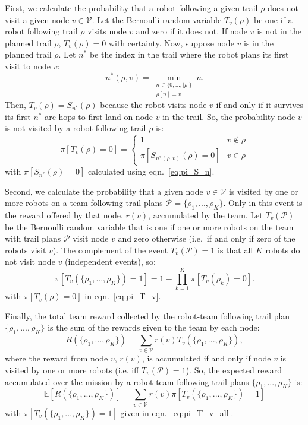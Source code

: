 \documentclass[fleqn,10pt,lineno]{wlpeerj}
\begin{document}
First, we calculate the probability that a robot following a given trail $\rho$ does not visit a given node $v\in \mathcal{V}$.
Let the Bernoulli random variable $T_v(\rho)$ be one if a robot following trail $\rho$ visits node $v$ and zero if it does not.
If node $v$ is not in the planned trail $\rho$, $T_v(\rho)=0$ with certainty. 
Now, suppose node $v$ is in the planned trail $\rho$. Let $n^*$ be the index in the trail where the robot plans its first visit to node $v$:
\begin{equation}
n^*(\rho, v) = \min_{
	\substack{n \in \{0, ..., \lvert \rho \rvert\} \\ \rho[n] = v}
} n.
\end{equation}
Then, $T_v(\rho)=S_{n^*}(\rho)$ because the robot visits node $v$ if and only if it survives its first $n^*$ arc-hops to first land on node $v$ in the trail. 
So, the probability node $v$ is not visited by a robot following trail $\rho$ is:
\begin{equation}
	\pi[T_v(\rho) = 0] = 
	\begin{cases}
		1 & v\notin \rho\\
		 \pi [S_{n^*(\rho, v)}(\rho)=0 ] & v \in \rho
	\end{cases}
	 \label{eq:pi_T_v}
\end{equation}
with $\pi[S_{n^*}(\rho)=0]$ calculated using eqn.~\ref{eq:pi_S_n}.

Second, we calculate the probability that a given node $v\in\mathcal{V}$ is visited by one or more robots on a team following trail plans $\mathcal{P}=\{\rho_1, ..., \rho_K\}$. Only in this event is the reward offered by that node, $r(v)$, accumulated by the team.
Let $T_v(\mathcal{P})$ be the Bernoulli random variable that is one if one or more robots on the team with trail plans $\mathcal{P}$ visit node $v$ and zero otherwise (i.e.\ if and only if zero of the robots visit $v$).
The complement of the event $T_v(\mathcal{P})=1$ is that all $K$ robots do not visit node $v$ (independent events), so:
\begin{equation}
	\pi [T_v( \{\rho_1, ..., \rho_K\} ) = 1] = 
	1 - \prod_{k=1}^K \pi[T_v(\rho_k)=0].
	\label{eq:pi_T_v_all}
\end{equation} 
with $\pi[T_v(\rho) = 0]$ in eqn.~\ref{eq:pi_T_v}.

Finally, the total team reward collected by the robot-team following trail plan $\{\rho_1, ..., \rho_K\}$ is the sum of the rewards given to the team by each node:
\begin{equation}
R(\{\rho_1,...,\rho_K\}) = \sum_{v\in\mathcal{V}} r(v)  T_v(\{\rho_1, ..., \rho_K\}),
\end{equation} where the reward from node $v$, $r(v)$, is accumulated if and only if node $v$ is visited by one or more robots (i.e. iff $T_v(\mathcal{P})=1$).
So, the expected reward accumulated over the mission by a robot-team following trail plans $\{\rho_1, ..., \rho_K\}$ is:
\begin{equation}
	\mathbb{E}[R(\{\rho_1,...,\rho_K\})]= \sum_{v\in\mathcal{V}} r(v) \pi[T_v(\{\rho_1, ..., \rho_K\}) = 1] \label{eq:formula_obj1}
\end{equation}
with $ \pi[T_v(\{\rho_1, ..., \rho_K\}) = 1]$ given in eqn.~\ref{eq:pi_T_v_all}.
\end{document}
